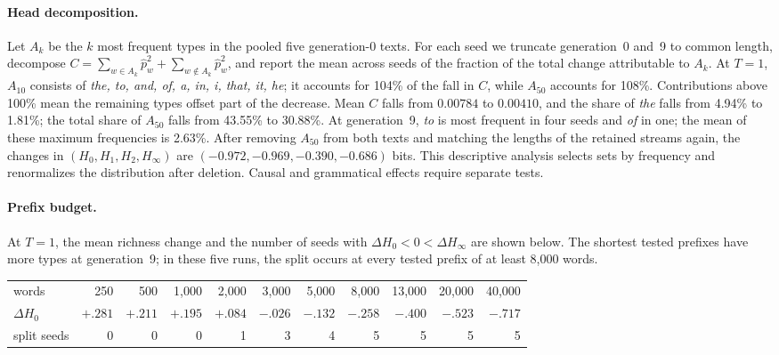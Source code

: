 \documentclass[10pt]{article}
\theoremstyle{plain}
\theoremstyle{definition}
\begin{document}
\paragraph{Head decomposition.} Let $A_k$ be the $k$ most frequent types in the pooled five
generation-0 texts. For each seed we truncate generation~0 and~9 to common length, decompose
$C=\sum_{w\in A_k}\hat p_w^2+\sum_{w\notin A_k}\hat p_w^2$, and report the mean across seeds
of the fraction of the total change attributable to $A_k$. At $T=1$, $A_{10}$ consists of
\emph{the, to, and, of, a, in, i, that, it, he}; it accounts for 104\% of the fall in $C$,
while $A_{50}$ accounts for 108\%. Contributions above 100\% mean the remaining types offset
part of the decrease. Mean $C$ falls from $0.00784$ to $0.00410$, and the share of \emph{the}
falls from 4.94\% to 1.81\%; the total share of $A_{50}$ falls from 43.55\% to 30.88\%.
At generation~9, \emph{to} is most frequent in four seeds and \emph{of} in one; the mean of these maximum frequencies is 2.63\%.
After removing $A_{50}$ from both texts and matching the lengths of the retained streams again,
the changes in $(H_0,H_1,H_2,H_\infty)$ are $(-0.972,-0.969,-0.390,-0.686)$ bits.
This descriptive analysis selects sets by frequency and renormalizes the distribution after
deletion. Causal and grammatical effects require separate tests.

\paragraph{Prefix budget.} At $T=1$, the mean richness change and the number of seeds with
$\Delta H_0<0<\Delta H_\infty$ are shown below. The shortest tested prefixes have more types
at generation~9; in these five runs, the split occurs at every tested prefix of at least
8,000 words.
\begin{center}\small
\setlength{\tabcolsep}{3pt}
\begin{tabular}{lrrrrrrrrrr}
\toprule
words & 250 & 500 & 1,000 & 2,000 & 3,000 & 5,000 & 8,000 & 13,000 & 20,000 & 40,000 \\
$\Delta H_0$ & $+.281$ & $+.211$ & $+.195$ & $+.084$ & $-.026$ & $-.132$ & $-.258$ & $-.400$ & $-.523$ & $-.717$ \\
split seeds & 0 & 0 & 0 & 1 & 3 & 4 & 5 & 5 & 5 & 5 \\
\bottomrule
\end{tabular}
\end{center}
\end{document}
